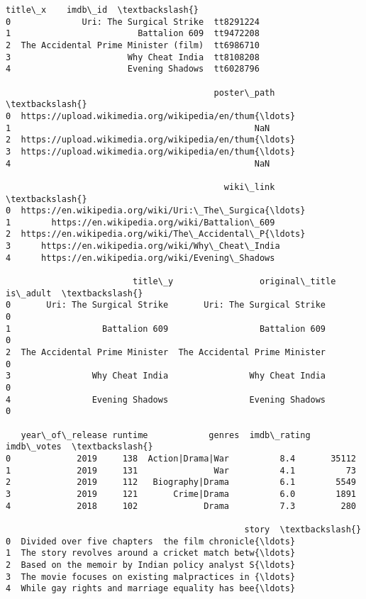 \documentclass[11pt]{article}
\makeatletter
\newcommand{\boxspacing}{\kern\kvtcb@left@rule\kern\kvtcb@boxsep}
\newcommand{\prompt}[4]{
        {\ttfamily\llap{{\color{#2}[#3]:\hspace{3pt}#4}}\vspace{-\baselineskip}}
    }
\makeatother
\begin{document}
            \begin{tcolorbox}[breakable, size=fbox, boxrule=.5pt, pad at break*=1mm, opacityfill=0]
\prompt{Out}{outcolor}{6}{\boxspacing}
\begin{Verbatim}[commandchars=\\\{\}]
                                title\_x    imdb\_id  \textbackslash{}
0              Uri: The Surgical Strike  tt8291224
1                         Battalion 609  tt9472208
2  The Accidental Prime Minister (film)  tt6986710
3                       Why Cheat India  tt8108208
4                       Evening Shadows  tt6028796

                                         poster\_path  \textbackslash{}
0  https://upload.wikimedia.org/wikipedia/en/thum{\ldots}
1                                                NaN
2  https://upload.wikimedia.org/wikipedia/en/thum{\ldots}
3  https://upload.wikimedia.org/wikipedia/en/thum{\ldots}
4                                                NaN

                                           wiki\_link  \textbackslash{}
0  https://en.wikipedia.org/wiki/Uri:\_The\_Surgica{\ldots}
1        https://en.wikipedia.org/wiki/Battalion\_609
2  https://en.wikipedia.org/wiki/The\_Accidental\_P{\ldots}
3      https://en.wikipedia.org/wiki/Why\_Cheat\_India
4      https://en.wikipedia.org/wiki/Evening\_Shadows

                         title\_y                 original\_title  is\_adult  \textbackslash{}
0       Uri: The Surgical Strike       Uri: The Surgical Strike         0
1                  Battalion 609                  Battalion 609         0
2  The Accidental Prime Minister  The Accidental Prime Minister         0
3                Why Cheat India                Why Cheat India         0
4                Evening Shadows                Evening Shadows         0

   year\_of\_release runtime            genres  imdb\_rating  imdb\_votes  \textbackslash{}
0             2019     138  Action|Drama|War          8.4       35112
1             2019     131               War          4.1          73
2             2019     112   Biography|Drama          6.1        5549
3             2019     121       Crime|Drama          6.0        1891
4             2018     102             Drama          7.3         280

                                               story  \textbackslash{}
0  Divided over five chapters  the film chronicle{\ldots}
1  The story revolves around a cricket match betw{\ldots}
2  Based on the memoir by Indian policy analyst S{\ldots}
3  The movie focuses on existing malpractices in {\ldots}
4  While gay rights and marriage equality has bee{\ldots}


\end{Verbatim}
\end{tcolorbox}
\end{document}
